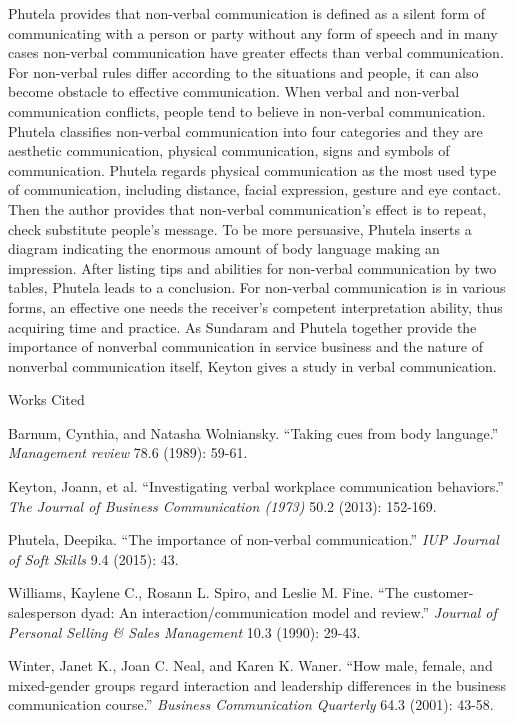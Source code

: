 \documentclass[12pt]{article}
\newcommand{\bibent}{\noindent \hangindent 40pt}
\newenvironment{workscited}{\newpage \begin{center} Works Cited \end{center}}{\newpage }
\begin{document}
\begin{flushleft}
Phutela provides that non-verbal communication is defined as a silent form of
communicating with a person or party without any form of speech and in many
cases non-verbal communication have greater effects than verbal communication.
For non-verbal rules differ according to the situations and people, it
can also become obstacle to effective communication.
When verbal and non-verbal communication conflicts, people tend to believe in
non-verbal communication.
Phutela classifies non-verbal communication into four categories and they are
aesthetic communication, physical communication, signs and symbols of
communication.
Phutela regards physical communication as the most used type of communication,
including distance, facial expression, gesture and eye contact.
Then the author provides that non-verbal communication’s effect is to repeat,
check substitute people’s message.
To be more persuasive, Phutela inserts a diagram indicating the enormous amount
of body language making an impression.
After listing tips and abilities for non-verbal communication by two tables,
Phutela leads to a conclusion.
For non-verbal communication is in various forms, an effective one needs the
receiver’s competent interpretation ability, thus acquiring time and practice.
As Sundaram and Phutela together provide the importance of nonverbal 
communication in service business and the nature of nonverbal communication
itself, Keyton gives a study in verbal communication.







\newpage
\begin{workscited}


  
\bibent
Barnum, Cynthia, and Natasha Wolniansky. ``Taking cues from body language.'' \textit{Management review} 78.6 (1989): 59-61.

\bibent
Keyton, Joann, et al. ``Investigating verbal workplace communication
behaviors.'' \textit{The Journal of Business Communication (1973) } 50.2 (2013): 152-169. 

\bibent
Phutela, Deepika. ``The importance of non-verbal communication.'' \textit{IUP Journal of Soft Skills} 9.4 (2015): 43.

\bibent
Williams, Kaylene C., Rosann L. Spiro, and Leslie M. Fine. ``The customer-salesperson dyad: An interaction/communication model and review.'' \textit{Journal of Personal Selling \& Sales Management} 10.3 (1990): 29-43.

\bibent
Winter, Janet K., Joan C. Neal, and Karen K. Waner. ``How male, female, and mixed-gender groups regard interaction and leadership differences in the business communication course.''  \textit{Business Communication Quarterly} 64.3 (2001): 43-58.



\end{workscited}

\end{flushleft}
\end{document}
